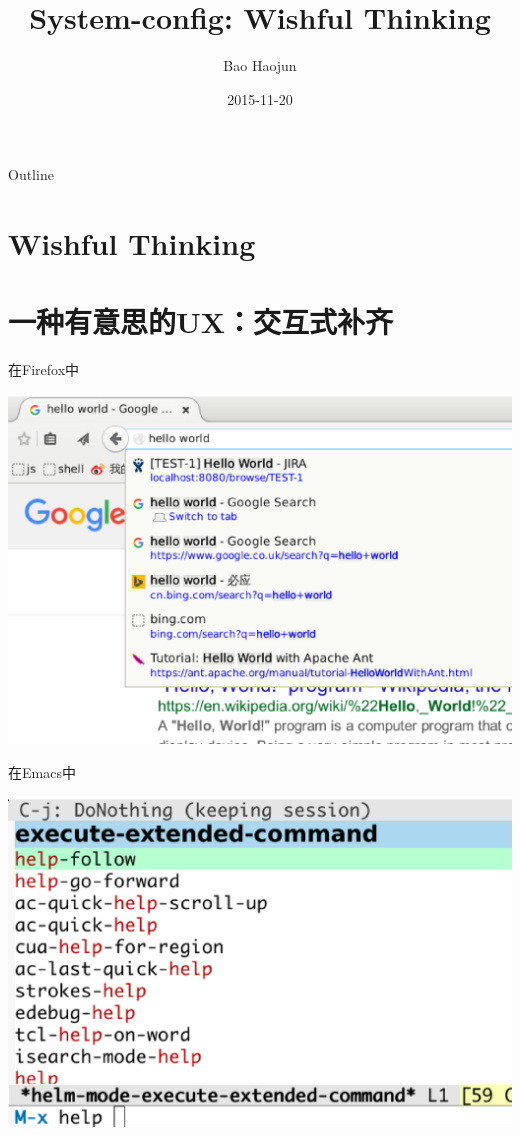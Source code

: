 \documentclass[presentation,dvipdfmx,CJKbookmarks]{beamer}
\author{Bao Haojun}
\date{2015-11-20}
\title{System-config: Wishful Thinking}
\begin{document}
\begin{CJK*}{UTF8}{simsun}

\maketitle
\begin{frame}{Outline}
\tableofcontents
\end{frame}

\CJKtilde

\section{Wishful Thinking}
\label{sec:org1a70d08}

\section{一种有意思的UX：交互式补齐}
\label{sec:org1f3c5e4}
\begin{frame}[label={sec:org2ffb0b5}]{在Firefox中}
\begin{center}
\includegraphics[width=.9\linewidth]{./images/firefox.ps}
\end{center}
\end{frame}

\begin{frame}[label={sec:orgcd7abf9}]{在Emacs中}
\begin{center}
\includegraphics[width=.9\linewidth]{./images/emacs.ps}
\end{center}
\end{frame}


\end{CJK*}
\end{document}
